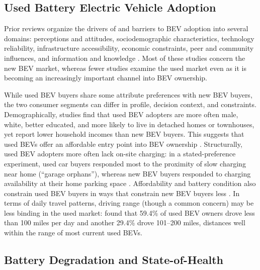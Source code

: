 \documentclass[a4paper,fleqn]{cas-sc}   %
\begin{document}
\subsection{Used Battery Electric Vehicle Adoption}

Prior reviews organize the drivers of and barriers to BEV adoption into several domains: perceptions and attitudes, sociodemographic characteristics, technology reliability, infrastructure accessibility, economic constraints, peer and community influences, and information and knowledge \parencite{yuanInvestigationRangeAnxiety2018, zouEffectsChargingInfrastructure2020, iogansenDecipheringFactorsAssociated2023a, naseriWhoMoreLikely2024, sonarExaminingCausalFactors2023, goreDCIConsumerValuation2025,iogansenConsumersPerceptionsKnowledge2026,lohawalaDeterminantsEVPurchase2026}. Most of these studies concern the new BEV market, whereas fewer studies examine the used market even as it is becoming an increasingly important channel into BEV ownership.

While used BEV buyers share some attribute preferences with new BEV buyers, the two consumer segments can differ in profile, decision context, and constraints. Demographically, studies find that used BEV adopters are more often male, white, better educated, and more likely to live in detached homes or townhouses, yet report lower household incomes than new BEV buyers. This suggests that used BEVs offer an affordable entry point into BEV ownership \parencite{talFirstLookPlugin2017, sheykhfardAnalyzingPurchaseIntentions2025, mashrurUncoveringFactorsAffecting2025}. Structurally, used BEV adopters more often lack on-site charging: in a stated-preference experiment, used car buyers responded most to the proximity of slow charging near home (``garage orphans''), whereas new BEV buyers responded to charging availability at their home parking space \parencite{zouEffectsChargingInfrastructure2020}. Affordability and battery condition also constrain used BEV buyers in ways that constrain new BEV buyers less \parencite{canepaEarlyLookPlugin2019, lohConcernsExpressedUsed2024}. In terms of daily travel patterns, driving range (though a common concern) may be less binding in the used market: \textcite{sheykhfardAnalyzingPurchaseIntentions2025} found that 59.4\% of used BEV owners drove less than 100 miles per day and another 29.4\% drove 101--200 miles, distances well within the range of most current used BEVs. 



\subsection{Battery Degradation and State-of-Health}
\end{document}
